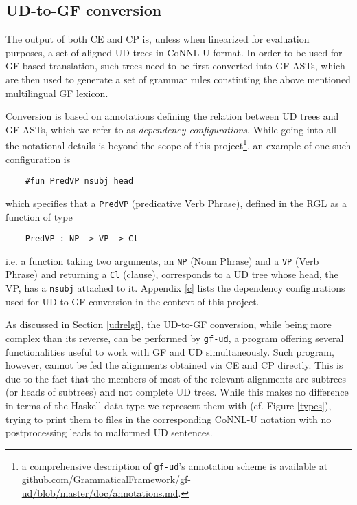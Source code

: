 \subsection{UD-to-GF conversion}
The output of both CE and CP is, unless when linearized for evaluation purposes, a set of aligned UD trees in CoNNL-U format. In order to be used for GF-based translation, such trees need to be first converted into GF ASTs, which are then used to generate a set of grammar rules constiuting the above mentioned multilingual GF lexicon. \smallskip

Conversion is based on annotations defining the relation between UD trees and GF ASTs, which we refer to as \textit{dependency configurations}. 
While going into all the notational details is beyond the scope of this project\footnote{a comprehensive description of \texttt{gf-ud}'s annotation scheme is available at \url{github.com/GrammaticalFramework/gf-ud/blob/master/doc/annotations.md}.}, an example of one such configuration is 

\begin{verbatim}
    #fun PredVP	nsubj head
\end{verbatim}

which specifies that a \texttt{PredVP} (predicative Verb Phrase), defined in the RGL as a function of type

\begin{verbatim}
    PredVP : NP -> VP -> Cl
\end{verbatim}

i.e. a function taking two arguments, an \texttt{NP} (Noun Phrase) and a \texttt{VP} (Verb Phrase) and returning a \texttt{Cl} (clause), corresponds to a UD tree whose head, the VP, has a \texttt{nsubj} attached to it. Appendix \ref{c} lists the dependency configurations used for UD-to-GF conversion in the context of this project.
\smallskip

As discussed in Section \ref{udrelgf}, the UD-to-GF conversion, while being more complex than its reverse, can be performed by \texttt{gf-ud}, a program offering several functionalities useful to work with GF and UD simultaneously.
Such program, however, cannot be fed the alignments obtained via CE and CP directly. This is due to the fact that the members of most of the relevant alignments are subtrees (or heads of subtrees) and not complete UD trees. 
While this makes no difference in terms of the Haskell data type we represent them with (cf. Figure \ref{types}), trying to print them to files in the corresponding CoNNL-U notation with no postprocessing leads to malformed UD sentences. \smallskip

